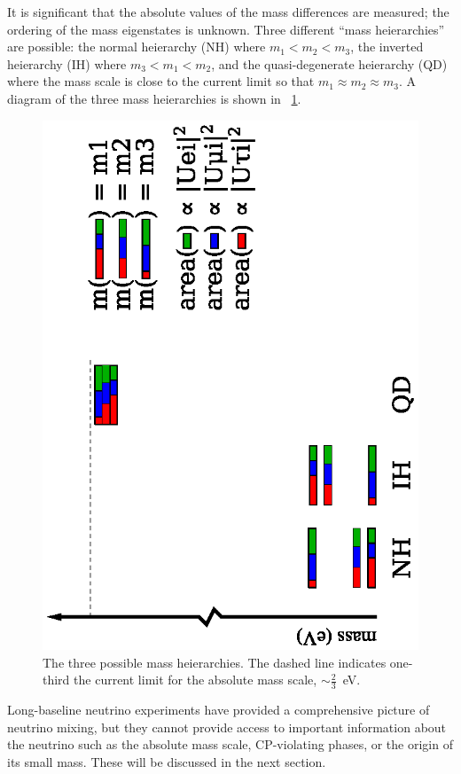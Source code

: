 It is significant that the absolute values of the mass differences are measured; the ordering of the mass eigenstates is unknown.  Three different ``mass heierarchies'' are possible: the normal heierarchy (NH) where $m_1 < m_2 < m_3$, the inverted heierarchy (IH) where $m_3 < m_1 < m_2$, and the quasi-degenerate heierarchy (QD) where the mass scale is close to the current limit so that $m_1 \approx m_2 \approx m_3$.  A diagram of the three mass heierarchies is shown in {\fig}~\ref{fig:massScale}.
\begin{figure}[htp]
\centering
\includegraphics[height=0.8\textwidth,angle=-90]{figures/mass_scale.eps}
\caption{The three possible mass heierarchies.  The dashed line indicates one-third the current limit for the absolute mass scale, $\sim\frac{2}{3}$~eV.}
\label{fig:massScale}
\end{figure}  

Long-baseline neutrino experiments have provided a comprehensive picture of neutrino mixing, but they cannot provide access to important information about the neutrino such as the absolute mass scale, CP-violating phases, or the origin of its small mass.  These will be discussed in the next section.


